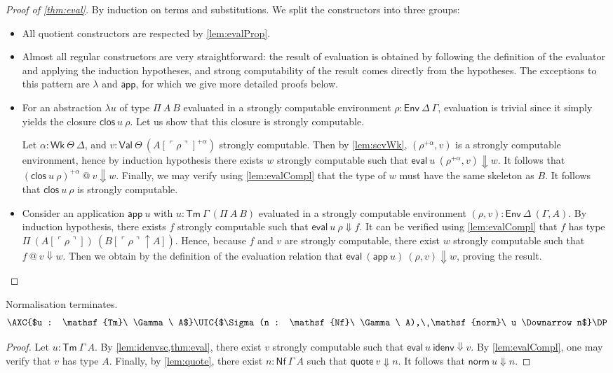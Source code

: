 \documentclass[a4paper,UKenglish,cleveref]{lipics-v2019}
\newcommand{\agdaSymb}[1]{\mathsf{#1}}
\newcommand{\Tm}{\agdaSymb{Tm}}
\newcommand{\app}{\agdaSymb{app}}
\newcommand{\lam}{\lambda}
\newcommand{\Vars}{\agdaSymb{Wk}}
\newcommand{\Val}{\agdaSymb{Val}}
\newcommand{\Env}{\agdaSymb{Env}}
\newcommand{\clos}{\agdaSymb{clos}}
\newcommand{\idenv}{\agdaSymb{idenv}}
\newcommand{\Nf}{\agdaSymb{Nf}}
\newcommand{\eval}{\agdaSymb{eval}}
\newcommand{\q}{\agdaSymb{quote}}
\newcommand{\norm}{\agdaSymb{norm}}
\newcommand{\cul}{\ulcorner}
\newcommand{\cur}{\urcorner}
\newcommand{\Da}{\Downarrow}
\newcommand{\lift}{\!\uparrow\!}
\begin{document}
\begin{proof}[Proof of \cref{thm:eval}]
  By induction on terms and substitutions. We split the constructors into three
  groups:
  \begin{itemize}
  \item All quotient constructors are respected by \cref{lem:evalProp}.
  \item Almost all regular constructors are very straightforward: the result of
    evaluation is obtained by following the definition of the evaluator and
    applying the induction hypotheses, and strong computability of the result
    comes directly from the hypotheses. The exceptions to this pattern are $\lam$
    and $\app$, for which we give more detailed proofs below.
  \item For an abstraction $\lam u$ of type $\Pi\ A\ B$ evaluated in a strongly
    computable environment $\rho : \Env\ \Delta\ \Gamma$, evaluation is trivial
    since it simply yields the closure $\clos\ u\ \rho$. Let us show that this
    closure is strongly computable.

    Let $\alpha : \Vars\ \Theta\ \Delta$, and $v : \Val\ \Theta\ (A[\cul \rho \cur]^{+\alpha})$
    strongly computable. Then by \cref{lem:scvWk}, $(\rho^{+\alpha},v)$ is
    a strongly computable environment, hence by induction hypothesis there exists
    $w$ strongly computable such that $\eval\ u\ (\rho^{+\alpha},v) \Da w$.
    It follows that $(\clos\ u\ \rho)^{+\alpha}\ @\ v \Da w$. Finally, we
    may verify using \cref{lem:evalCompl} that the type of $w$ must have
    the same skeleton as $B$. It follows that $\clos\ u\ \rho$ is strongly
    computable.
  \item Consider an application $\app\ u$ with $u : \Tm\ \Gamma\ (\Pi\ A\ B)$
    evaluated in a strongly computable environment $(\rho,v) : \Env\ \Delta\ (\Gamma,A)$.
    By induction hypothesis, there exists $f$ strongly computable such that
    $\eval\ u\ \rho \Da f$. It can be verified using \cref{lem:evalCompl}
    that $f$ has type $\Pi\ (A[\cul \rho \cur])\ (B[\cul \rho \cur \lift A])$.
    Hence, because $f$ and $v$ are strongly computable, there exist $w$ strongly
    computable such that $f\ @\ v \Da w$. Then we obtain by the definition of
    the evaluation relation that $\eval\ (\app\ u)\ (\rho,v) \Da w$, proving
    the result.
  \end{itemize}
\end{proof}

\begin{theorem}[Termination]
  \label{thm:termination}
  Normalisation terminates.
  \[ \AXC{$u : \Tm\ \Gamma\ A$}\UIC{$\Sigma(n : \Nf\ \Gamma\ A),\ \norm\ u \Da n$}\DP \]
\end{theorem}
\begin{proof}
  Let $u : \Tm\ \Gamma\ A$. By \cref{lem:idenvsc,thm:eval},
  there exist $v$ strongly computable such that $\eval\ u\ \idenv \Da v$.
  By \cref{lem:evalCompl}, one may verify that $v$ has type $A$.
  Finally, by \cref{lem:quote}, there exist $n : \Nf\ \Gamma\ A$ such that
  $\q\ v \Da n$. It follows that $\norm\ u \Da n$.
\end{proof}
\end{document}
